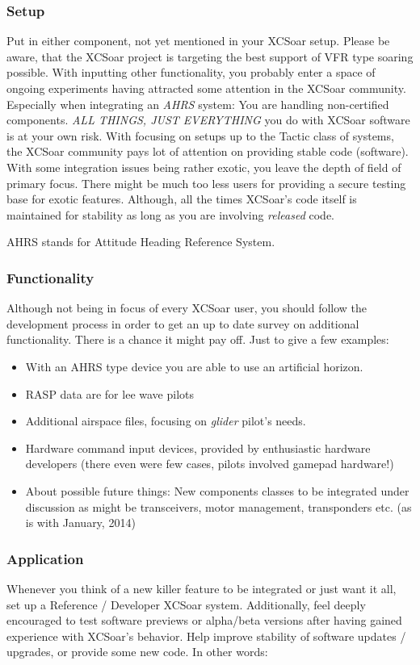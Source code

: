 \subsubsection*{Setup} Put in either component, not yet mentioned in your XCSoar 
setup. Please be aware, that the XCSoar project is targeting the best support of 
VFR type soaring possible. With inputting other functionality, you probably enter 
a space of ongoing experiments having attracted some attention in the XCSoar 
community. Especially when integrating an \emph{AHRS} system: You are handling 
non-certified components. \tip \emph{ALL THINGS, JUST EVERYTHING} you do with 
XCSoar software is at your own risk. With focusing on setups up to the Tactic 
class of systems, the XCSoar community pays lot of attention on providing stable 
code (software). With some integration issues being rather exotic, you leave the 
depth of field of primary focus. There might be much too less users for providing 
a secure testing base for exotic features. Although, all the times XCSoar's code 
itself is maintained for stability as long as you are involving \emph{released} 
code.

AHRS stands for Attitude Heading Reference System.

\subsubsection*{Functionality} Although not being in focus of every XCSoar user, 
you should follow the development process in order to get an up to date survey on 
additional functionality. There is a chance it might pay off. Just to give a few 
examples:
\begin{itemize}
\item With an AHRS type device you are able to use an artificial horizon.
\item RASP data are for lee wave pilots
\item Additional airspace files, focusing on \emph{glider} pilot's needs.
\item Hardware command input devices, provided by enthusiastic hardware 
developers (there even were few cases, pilots involved gamepad hardware!)
\item About possible future things: New components classes to be integrated  
under discussion as might be transceivers, motor management, transponders etc. 
(as is with January, 2014)
\end{itemize}

\subsubsection*{Application} Whenever you think of a new killer feature to be 
integrated or just want it all, set up a Reference / Developer XCSoar system.
Additionally, feel deeply encouraged to test software previews or alpha/beta 
versions after having gained experience with XCSoar's behavior. Help improve 
stability of software updates / upgrades, or provide some new code. In other 
words:

